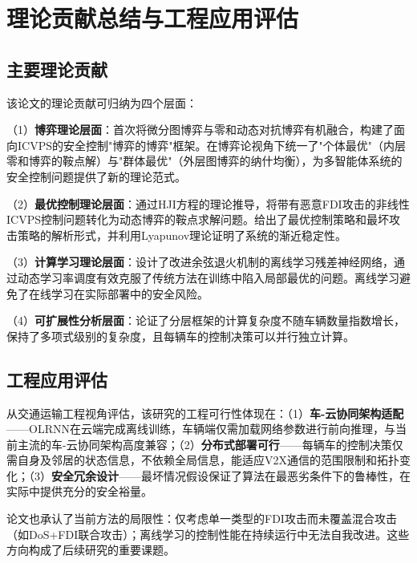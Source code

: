 \documentclass[10.5pt,a4paper,twoside,twocolumn]{ctexart}
\begin{document}
\section{\heiti{} 理论贡献总结与工程应用评估}

\subsection{\heiti{} 主要理论贡献}

该论文的理论贡献可归纳为四个层面：

（1）\textbf{博弈理论层面}：首次将微分图博弈与零和动态对抗博弈有机融合，构建了面向ICVPS的安全控制"博弈的博弈"框架。在博弈论视角下统一了"个体最优"（内层零和博弈的鞍点解）与"群体最优"（外层图博弈的纳什均衡），为多智能体系统的安全控制问题提供了新的理论范式。

（2）\textbf{最优控制理论层面}：通过HJI方程的理论推导，将带有恶意FDI攻击的非线性ICVPS控制问题转化为动态博弈的鞍点求解问题。给出了最优控制策略和最坏攻击策略的解析形式，并利用Lyapunov理论证明了系统的渐近稳定性。

（3）\textbf{计算学习理论层面}：设计了改进余弦退火机制的离线学习残差神经网络，通过动态学习率调度有效克服了传统方法在训练中陷入局部最优的问题。离线学习避免了在线学习在实际部署中的安全风险。

（4）\textbf{可扩展性分析层面}：论证了分层框架的计算复杂度不随车辆数量指数增长，保持了多项式级别的复杂度，且每辆车的控制决策可以并行独立计算。

\subsection{\heiti{} 工程应用评估}

从交通运输工程视角评估，该研究的工程可行性体现在：（1）\textbf{车-云协同架构适配}——OLRNN在云端完成离线训练，车辆端仅需加载网络参数进行前向推理，与当前主流的车-云协同架构高度兼容；（2）\textbf{分布式部署可行}——每辆车的控制决策仅需自身及邻居的状态信息，不依赖全局信息，能适应V2X通信的范围限制和拓扑变化；（3）\textbf{安全冗余设计}——最坏情况假设保证了算法在最恶劣条件下的鲁棒性，在实际中提供充分的安全裕量。

论文也承认了当前方法的局限性：仅考虑单一类型的FDI攻击而未覆盖混合攻击（如DoS+FDI联合攻击）；离线学习的控制性能在持续运行中无法自我改进。这些方向构成了后续研究的重要课题。

\end{document}
